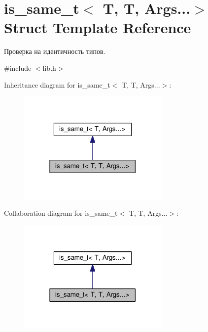 \hypertarget{structis__same__t_3_01T_00_01T_00_01Args_8_8_8_4}{\section{is\-\_\-same\-\_\-t$<$ T, T, Args...$>$ Struct Template Reference}
\label{structis__same__t_3_01T_00_01T_00_01Args_8_8_8_4}
}


Проверка на идентичность типов.  




{\ttfamily \#include $<$lib.\-h$>$}



Inheritance diagram for is\-\_\-same\-\_\-t$<$ T, T, Args...$>$\-:
\nopagebreak
\begin{figure}[H]
\begin{center}
\leavevmode
\includegraphics[width=210pt]{structis__same__t_3_01T_00_01T_00_01Args_8_8_8_4__inherit__graph}
\end{center}
\end{figure}


Collaboration diagram for is\-\_\-same\-\_\-t$<$ T, T, Args...$>$\-:
\nopagebreak
\begin{figure}[H]
\begin{center}
\leavevmode
\includegraphics[width=210pt]{structis__same__t_3_01T_00_01T_00_01Args_8_8_8_4__coll__graph}
\end{center}
\end{figure}


